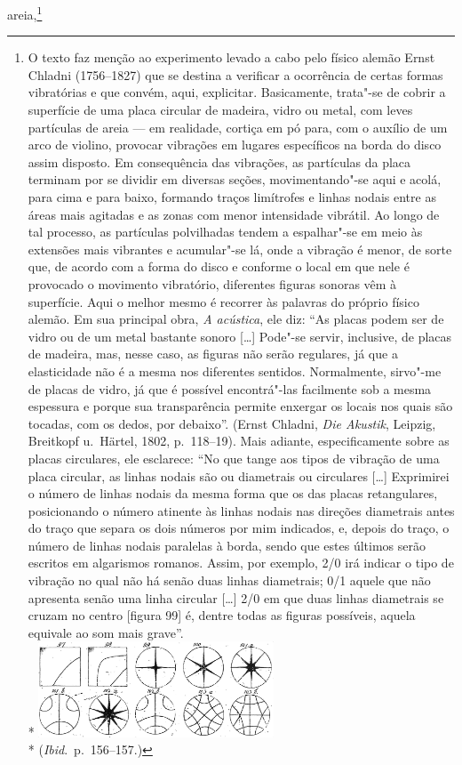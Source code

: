 areia,\footnote{ O texto faz menção ao experimento levado a cabo pelo
físico alemão Ernst Chladni (1756--1827) que se destina a
verificar a ocorrência de certas formas vibratórias e que convém, aqui,
explicitar. Basicamente, trata"-se de cobrir a superfície de uma placa
circular de madeira, vidro ou metal, com leves partículas de areia --- em
realidade, cortiça em pó para, com o auxílio de um arco de violino,
provocar vibrações em lugares específicos na borda do disco assim
disposto. Em consequência das vibrações, as partículas da placa
terminam por se dividir em diversas seções, movimentando"-se aqui e
acolá, para cima e para baixo, formando traços limítrofes e linhas
nodais entre as áreas mais agitadas e as zonas com menor intensidade
vibrátil. Ao longo de tal processo, as partículas polvilhadas tendem a
espalhar"-se em meio às extensões mais vibrantes e acumular"-se lá,
onde a vibração é menor, de sorte que, de acordo com a forma do disco e
conforme o local em que nele é provocado o movimento vibratório,
diferentes figuras sonoras vêm à superfície. Aqui o melhor
mesmo é recorrer às palavras do próprio físico alemão. Em sua principal
obra, \textit{A acústica}, ele diz: “As placas podem ser de vidro ou de
um metal bastante sonoro [\ldots{}] Pode"-se servir, inclusive, de placas
de madeira, mas, nesse caso, as figuras não serão regulares, já que a
elasticidade não é a mesma nos diferentes sentidos. Normalmente,
sirvo"-me de placas de vidro, já que é possível encontrá"-las
facilmente sob a mesma espessura e porque sua transparência permite
enxergar os locais nos quais são tocadas, com os dedos, por debaixo”.
(Ernst Chladni, \textit{Die Akustik}, Leipzig,
Breitkopf u.~Härtel, 1802, p.~118--19). Mais adiante, especificamente
sobre as placas circulares, ele esclarece: “No que tange aos tipos de
vibração de uma placa circular, as linhas nodais são ou diametrais ou
circulares [\ldots{}] Exprimirei o número de linhas nodais da mesma forma
que os das placas retangulares, posicionando o número atinente às
linhas nodais nas direções diametrais antes do traço que separa os dois
números por mim indicados, e, depois do traço, o número de linhas
nodais paralelas à borda, sendo que estes últimos serão escritos em
algarismos romanos. Assim, por exemplo, 2/0 irá indicar o tipo de
vibração no qual não há senão duas linhas diametrais; 0/1 aquele que
não apresenta senão uma linha circular [\ldots{}] 2/0 em que duas linhas
diametrais se cruzam no centro [figura 99] é, dentre todas as
figuras possíveis, aquela equivale ao som mais grave''.\\*
\mbox{}\hfil\includegraphics[width=7cm]{imagem.png}\hfil\\*
\mbox{}\hfill(\textit{Ibid}.~p.~156--157.)}
